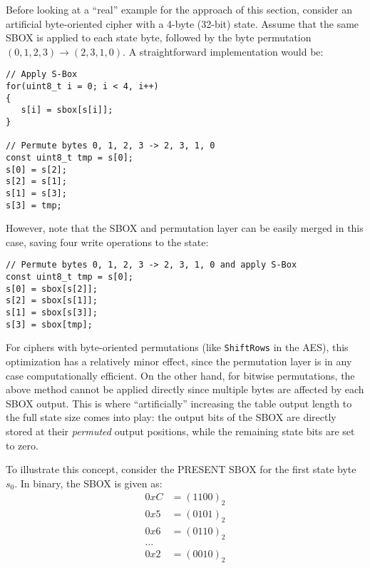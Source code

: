 Before looking at a ``real'' example for the approach of this section, consider an artificial byte-oriented cipher with a 4-byte (32-bit) state. Assume that the same \ac{SBOX} is applied to each state byte, followed by the byte permutation $\left(0, 1, 2, 3\right) \rightarrow \left(2, 3, 1, 0\right)$.
A straightforward implementation would be:

\lstset{language=C}
\begin{lstlisting}
// Apply S-Box
for(uint8_t i = 0; i < 4, i++)
{
   s[i] = sbox[s[i]];
}

// Permute bytes 0, 1, 2, 3 -> 2, 3, 1, 0
const uint8_t tmp = s[0];
s[0] = s[2];
s[2] = s[1];
s[1] = s[3];
s[3] = tmp;

\end{lstlisting}

However, note that the \ac{SBOX} and permutation layer can be easily merged in this case, saving four write operations to the state:

\lstset{language=C}
\begin{lstlisting}
// Permute bytes 0, 1, 2, 3 -> 2, 3, 1, 0 and apply S-Box
const uint8_t tmp = s[0];
s[0] = sbox[s[2]];
s[2] = sbox[s[1]];
s[1] = sbox[s[3]];
s[3] = sbox[tmp];
\end{lstlisting}

For ciphers with byte-oriented permutations (like \verb+ShiftRows+ in the \ac{AES}), this optimization has a relatively minor effect, since the permutation layer is in any case computationally efficient. On the other hand, for bitwise permutations, the above method cannot be applied directly since multiple bytes are affected by each \ac{SBOX} output. This is where ``artificially'' increasing the table output length to the full state size comes into play: the output bits of the \ac{SBOX} are directly stored at their \emph{permuted} output positions, while the remaining state bits are set to zero. 

To illustrate this concept, consider the PRESENT \ac{SBOX} for the first state byte $s_0$. In binary, the \ac{SBOX} is given as:
\begin{align}
	0xC &= \left(1100\right)_2 \nonumber \\ 
	0x5 &= \left(0101\right)_2 \nonumber \\ 
	0x6 &= \left(0110\right)_2 \nonumber \\
	\ldots \nonumber \\
	0x2 &= \left(0010\right)_2 \nonumber 
\end{align}
 

